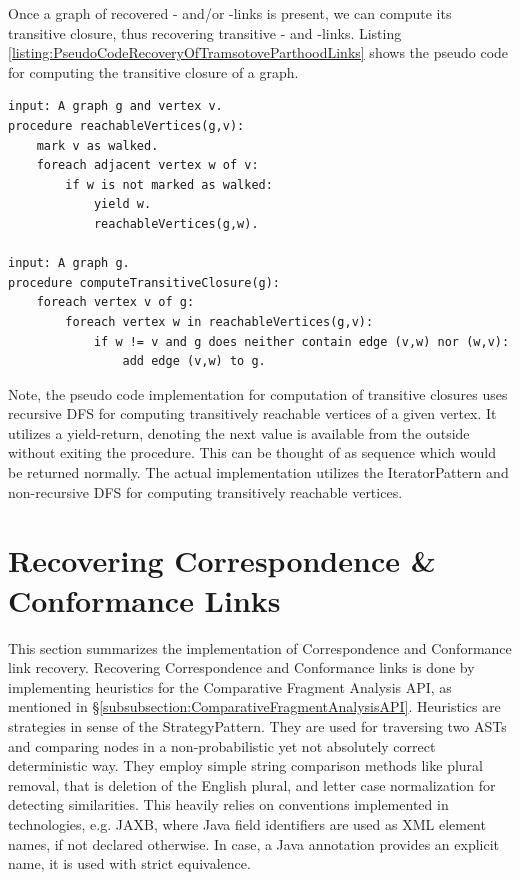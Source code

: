 Once a graph of recovered \partOf- and/or \fragmentOf-links is present, we can compute its transitive closure, thus recovering transitive \partOf- and \fragmentOf-links.
Listing \ref{listing:PseudoCodeRecoveryOfTramsotoveParthoodLinks} shows the pseudo code for computing the transitive closure of a graph.
\begin{lstlisting}[caption={Pseudo code Recovery of transitive Parthood Links},label={listing:PseudoCodeRecoveryOfTramsotoveParthoodLinks},morekeywords={procedure,foreach,input,output,if,yield}]
input: A graph g and vertex v.
procedure reachableVertices(g,v):
	mark v as walked.
	foreach adjacent vertex w of v:
		if w is not marked as walked:
			yield w.
			reachableVertices(g,w).
			
input: A graph g.
procedure computeTransitiveClosure(g):
	foreach vertex v of g:
		foreach vertex w in reachableVertices(g,v):
			if w != v and g does neither contain edge (v,w) nor (w,v):
				add edge (v,w) to g.
\end{lstlisting}
Note, the pseudo code implementation for computation of transitive closures uses  recursive \gls{DFS} for computing transitively reachable vertices of a given vertex.
It utilizes a yield-return, denoting the next value is available from the outside without exiting the procedure.
This can be thought of as sequence which would be returned normally.
The actual implementation utilizes the \gls{IteratorPattern} and non-recursive \gls{DFS} for computing transitively reachable vertices. 

\section{Recovering Correspondence \& Conformance Links}
\label{section:RecoveringCorrespondenceAndConformanceLinks}
This section summarizes the implementation of \gls{Correspondence} and \gls{Conformance} link recovery.
Recovering  \gls{Correspondence} and \gls{Conformance} links is done by implementing heuristics for the Comparative Fragment Analysis \gls{API}, as mentioned in §\ref{subsubsection:ComparativeFragmentAnalysisAPI}.
Heuristics are strategies in sense of the \gls{StrategyPattern}.
They are used for traversing two \glspl{AST} and comparing nodes in a non-probabilistic yet not absolutely correct deterministic way.
They employ simple string comparison methods like plural removal, that is deletion of the English plural, and letter case normalization for detecting similarities.
This heavily relies on conventions implemented in technologies, e.g. \gls{JAXB}, where \gls{Java} field identifiers are used as \gls{XML} element names, if not declared otherwise.
In case, a \gls{Java} annotation provides an explicit name, it is used with strict equivalence.

